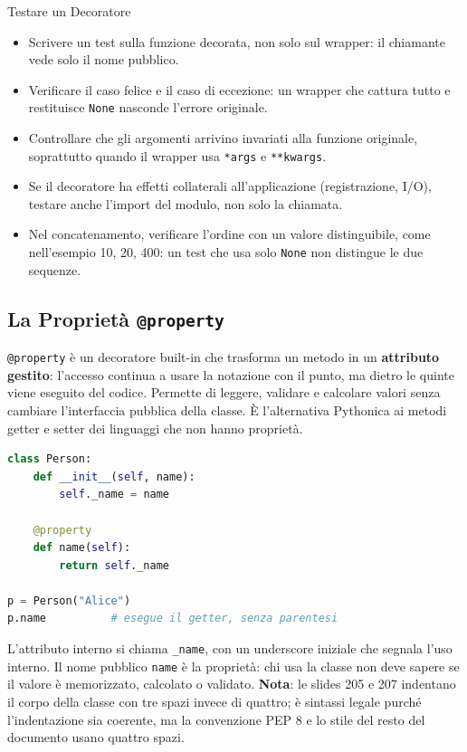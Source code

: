 \documentclass[12pt]{extarticle}
\begin{document}
\begin{cbox}{Testare un Decoratore}
\begin{itemize}
    \item Scrivere un test sulla funzione decorata, non solo sul wrapper: il chiamante vede solo il nome pubblico.
    \item Verificare il caso felice e il caso di eccezione: un wrapper che cattura tutto e restituisce \texttt{None} nasconde l'errore originale.
    \item Controllare che gli argomenti arrivino invariati alla funzione originale, soprattutto quando il wrapper usa \texttt{*args} e \texttt{**kwargs}.
    \item Se il decoratore ha effetti collaterali all'applicazione (registrazione, I/O), testare anche l'import del modulo, non solo la chiamata.
    \item Nel concatenamento, verificare l'ordine con un valore distinguibile, come nell'esempio 10, 20, 400: un test che usa solo \texttt{None} non distingue le due sequenze.
\end{itemize}
\end{cbox}

\subsection{La Proprietà \texttt{@property}}

\noindent \texttt{@property} è un decoratore built-in che trasforma un metodo in un \textbf{attributo gestito}: l'accesso continua a usare la notazione con il punto, ma dietro le quinte viene eseguito del codice. Permette di leggere, validare e calcolare valori senza cambiare l'interfaccia pubblica della classe. È l'alternativa Pythonica ai metodi getter e setter dei linguaggi che non hanno proprietà.

\begin{lstlisting}[language=Python]
class Person:
    def __init__(self, name):
        self._name = name

    @property
    def name(self):
        return self._name

p = Person("Alice")
p.name          # esegue il getter, senza parentesi
\end{lstlisting}

\noindent L'attributo interno si chiama \texttt{\_name}, con un underscore iniziale che segnala l'uso interno. Il nome pubblico \texttt{name} è la proprietà: chi usa la classe non deve sapere se il valore è memorizzato, calcolato o validato. \textbf{Nota}: le slides 205 e 207 indentano il corpo della classe con tre spazi invece di quattro; è sintassi legale purché l'indentazione sia coerente, ma la convenzione PEP 8 e lo stile del resto del documento usano quattro spazi.
\end{document}
